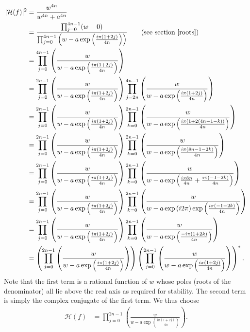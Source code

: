 \documentclass[a4paper]{article}
\begin{document}
\begin{align}
    |\mathcal{H}(f)|^2 &= \frac{w^{4n}}{w^{4n} + a^{4n}} \label{eq:high_pass_factor1}\\
                       &=  \frac{\prod_{j=0}^{4 n - 1}(w - 0)}{\prod_{j=0}^{4 n - 1}\left(w - a\exp\left(\frac{i \pi (1 + 2 j)}{4 n}\right)\right)} \qquad\textrm{(see section \ref{roots})} \label{eq:high_pass_factor2}\\
                       &= \prod_{j=0}^{4 n - 1} \left(\frac{w}{w - a\exp\left(\frac{i \pi (1 + 2 j)}{4 n}\right)}\right) \\
                       &= \prod_{j=0}^{2 n - 1} \left(\frac{w}{w - a\exp\left(\frac{i \pi (1 + 2 j)}{4 n}\right)}\right)
                          \prod_{j=2n}^{4 n - 1} \left(\frac{w}{w - a\exp\left(\frac{i \pi (1 + 2 j)}{4 n}\right)}\right) \\
                       &= \prod_{j=0}^{2 n - 1} \left(\frac{w}{w - a\exp\left(\frac{i \pi (1 + 2 j)}{4 n}\right)}\right)
                          \prod_{k=0}^{2 n - 1} \left(\frac{w}{w - a\exp\left(\frac{i \pi (1 + 2 (4 n - 1 - k))}{4 n}\right)}\right) \\
                       &= \prod_{j=0}^{2 n - 1} \left(\frac{w}{w - a\exp\left(\frac{i \pi (1 + 2 j)}{4 n}\right)}\right)
                          \prod_{k=0}^{2 n - 1} \left(\frac{w}{w - a\exp\left(\frac{i \pi (8n - 1 - 2 k)}{4 n}\right)}\right) \\
                       &= \prod_{j=0}^{2 n - 1} \left(\frac{w}{w - a\exp\left(\frac{i \pi (1 + 2 j)}{4 n}\right)}\right)
                          \prod_{k=0}^{2 n - 1} \left(\frac{w}{w - a\exp\left(\frac{i \pi 8 n}{4 n} + \frac{i \pi (- 1 - 2 k)}{4 n}\right)}\right) \\
                       &= \prod_{j=0}^{2 n - 1} \left(\frac{w}{w - a\exp\left(\frac{i \pi (1 + 2 j)}{4 n}\right)}\right)
                          \prod_{k=0}^{2 n - 1} \left(\frac{w}{w - a\exp\left(i 2 \pi\right) \exp\left(\frac{i \pi (- 1 - 2 k)}{4 n}\right)}\right) \\
                       &= \prod_{j=0}^{2 n - 1} \left(\frac{w}{w - a\exp\left(\frac{i \pi (1 + 2 j)}{4 n}\right)}\right)
                          \prod_{k=0}^{2 n - 1} \left(\frac{w}{w - a\exp\left(\frac{-i \pi (1 + 2 k)}{4 n}\right)}\right) \\
                       &= \left(\prod_{j=0}^{2 n - 1} \left(\frac{w}{w - a\exp\left(\frac{i \pi (1 + 2 j)}{4 n}\right)}\right)\right)
                          \left(\prod_{j=0}^{2 n - 1} \left(\frac{w}{w - a\exp\left(\frac{i \pi (1 + 2 j)}{4 n}\right)}\right)\right)^{*}.
\end{align}
Note that the first term is a rational function of $w$ whose poles (roots of
the denominator) all lie above the real axis as required for stability.  The
second term is simply the complex conjugate of the first term.  We thus choose
\begin{align}
    \mathcal{H}(f) &= \prod_{j=0}^{2 n - 1} \left(\frac{w}{w - a\exp\left(\frac{i \pi (1 + 2 j)}{4 n}\right)}\right).
\end{align}
\end{document}
